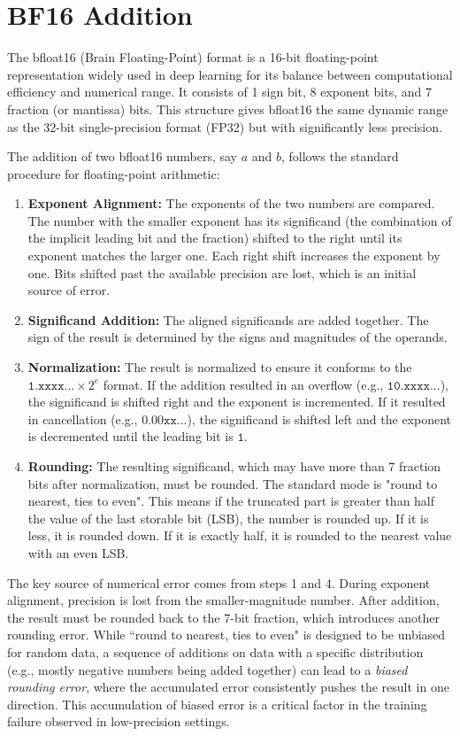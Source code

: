 \documentclass{article} %
\begin{document}
\section{BF16 Addition}\label{app:bf16_add}

The bfloat16 (Brain Floating-Point) format is a 16-bit floating-point representation widely used in deep learning for its balance between computational efficiency and numerical range. It consists of 1 sign bit, 8 exponent bits, and 7 fraction (or mantissa) bits. This structure gives bfloat16 the same dynamic range as the 32-bit single-precision format (FP32) but with significantly less precision.

The addition of two bfloat16 numbers, say $a$ and $b$, follows the standard procedure for floating-point arithmetic:
\begin{enumerate}[leftmargin=*]
    \item \textbf{Exponent Alignment:} The exponents of the two numbers are compared. The number with the smaller exponent has its significand (the combination of the implicit leading bit and the fraction) shifted to the right until its exponent matches the larger one. Each right shift increases the exponent by one. Bits shifted past the available precision are lost, which is an initial source of error.
    \item \textbf{Significand Addition:} The aligned significands are added together. The sign of the result is determined by the signs and magnitudes of the operands.
    \item \textbf{Normalization:} The result is normalized to ensure it conforms to the $\mathtt{1.xxxx...} \times 2^{e}$ format. If the addition resulted in an overflow (e.g., $\mathtt{10.xxxx...}$), the significand is shifted right and the exponent is incremented. If it resulted in cancellation (e.g., $\mathtt{0.00xx...}$), the significand is shifted left and the exponent is decremented until the leading bit is $\mathtt{1}$.
    \item \textbf{Rounding:} The resulting significand, which may have more than 7 fraction bits after normalization, must be rounded. The standard mode is "round to nearest, ties to even". This means if the truncated part is greater than half the value of the last storable bit (LSB), the number is rounded up. If it is less, it is rounded down. If it is exactly half, it is rounded to the nearest value with an even LSB.
\end{enumerate}

The key source of numerical error comes from steps 1 and 4. During exponent alignment, precision is lost from the smaller-magnitude number. After addition, the result must be rounded back to the 7-bit fraction, which introduces another rounding error. While ``round to nearest, ties to even" is designed to be unbiased for random data, a sequence of additions on data with a specific distribution (e.g., mostly negative numbers being added together) can lead to a \emph{biased rounding error}, where the accumulated error consistently pushes the result in one direction. This accumulation of biased error is a critical factor in the training failure observed in low-precision settings.
\end{document}
